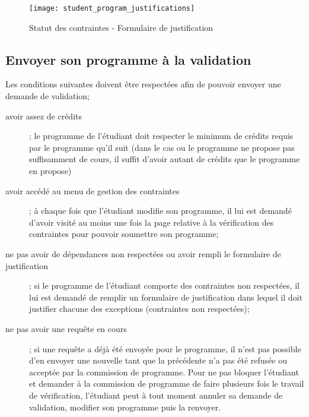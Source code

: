 \begin{figure}[htb]
\centering
\caption{Statut des contraintes - Formulaire de justification}
\label{fig:student_program_justifications}
\texttt{[image: student\_program\_justifications]}
\end{figure}

\subsection{Envoyer son programme à la validation}

Les conditions suivantes doivent être respectées afin de pouvoir envoyer une demande de validation;
\begin{description}
  \item[avoir assez de crédits] ; le programme de l'étudiant doit respecter le minimum de crédits requis par le programme qu'il suit (dans le cas ou le programme ne propose pas suffisamment de cours, il suffit d'avoir autant de crédits que le programme en propose)
  \item[avoir accédé au menu de gestion des contraintes] ; à chaque fois que l'étudiant modifie son programme, il lui est demandé d'avoir visité au moins une fois la page relative à la vérification des contraintes pour pouvoir soumettre son programme;
  \item[ne pas avoir de dépendances non respectées ou avoir rempli le formulaire de justification] ; si le programme de l'étudiant comporte des contraintes non respectées, il lui est demandé de remplir un formulaire de justification dans lequel il doit justifier chacune des exceptions (contraintes non respectées);
  \item[ne pas avoir une requête en cours] ; si une requête a déjà été envoyée pour le programme, il n'est pas possible d'en envoyer une nouvelle tant que la précédente n'a pas été refusée ou acceptée par la commission de programme. Pour ne pas bloquer l'étudiant et demander à la commission de programme de faire plusieurs fois le travail de vérification, l'étudiant peut à tout moment annuler sa demande de validation, modifier son programme puis la renvoyer. 
\end{description} 
